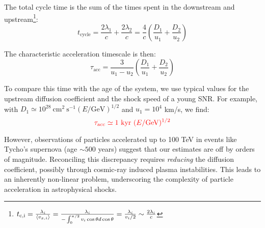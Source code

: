 The total cycle time is the sum of the times spent in the downstream and upstream\footnote{$
t_{\rm c, i} = \frac{\lambda_i}{\langle v_{x,i} \rangle} = \frac{\lambda_i}{-\int_0^{\pi/2} v_i \cos \theta d\cos\theta} = \frac{\lambda_i}{v_i / 2} \sim \frac{2\lambda_i}{c}$}:
%
\begin{equation}
t_{\text{cycle}} = \frac{2\lambda_1}{c} + \frac{2\lambda_2}{c} = \frac{4}{c} \left(\frac{D_1}{u_1} + \frac{D_2}{u_2}\right)
\end{equation}

The characteristic acceleration timescale is then:
%
\begin{equation}
\tau_{\text{acc}} = \frac{3}{u_1 - u_2} \left( \frac{D_1}{u_1} + \frac{D_2}{u_2} \right)
\end{equation}

To compare this time with the age of the system, we use typical values for the upstream diffusion coefficient and the shock speed of a young SNR. For example, with \( D_1 \simeq 10^{28}~\text{cm}^2~\text{s}^{-1} (E/\text{GeV})^{1/2} \) and \( u_1 = 10^4 \) km/s, we find:
%
\begin{equation}
{\color{red}\tau_{\text{acc}} \simeq 1~\text{kyr}~(E/\text{GeV})^{1/2}}
\end{equation}

However, observations of particles accelerated up to 100 TeV in events like Tycho's supernova (age \( \sim 500 \) years) suggest that our estimates are off by orders of magnitude. Reconciling this discrepancy requires \emph{reducing} the diffusion coefficient, possibly through cosmic-ray induced plasma instabilities. This leads to an inherently non-linear problem, underscoring the complexity of particle acceleration in astrophysical shocks.